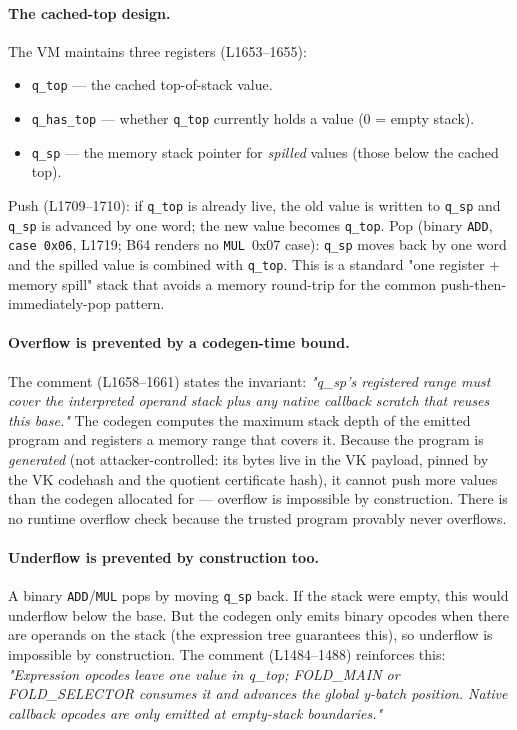 \paragraph{The cached-top design.} The VM maintains three
registers (L1653--1655):
\begin{itemize}
\item \texttt{q\_top} --- the cached top-of-stack value.
\item \texttt{q\_has\_top} --- whether \texttt{q\_top} currently
  holds a value (0 = empty stack).
\item \texttt{q\_sp} --- the memory stack pointer for
  \emph{spilled} values (those below the cached top).
\end{itemize}
Push (L1709--1710): if \texttt{q\_top} is already live, the old
value is written to \texttt{q\_sp} and \texttt{q\_sp} is advanced
by one word; the new value becomes \texttt{q\_top}. Pop
(binary \texttt{ADD}, \texttt{case 0x06}, L1719; B64 renders no
\texttt{MUL}~0x07 case): \texttt{q\_sp} moves
back by one word and the spilled value is combined with
\texttt{q\_top}. This is a standard "one register + memory spill"
stack that avoids a memory round-trip for the common
push-then-immediately-pop pattern.

\paragraph{Overflow is prevented by a codegen-time bound.} The
comment (L1658--1661) states the invariant: \emph{"q\_sp's
registered range must cover the interpreted operand stack plus any
native callback scratch that reuses this base."} The codegen
computes the maximum stack depth of the emitted program and
registers a memory range that covers it. Because the program is
\emph{generated} (not attacker-controlled: its bytes live in the VK
payload, pinned by the VK codehash and the quotient certificate
hash), it cannot push more
values than the codegen allocated for --- overflow is impossible
by construction. There is no runtime overflow check because the
trusted program provably never overflows.

\paragraph{Underflow is prevented by construction too.} A binary
\texttt{ADD}/\texttt{MUL} pops by moving \texttt{q\_sp} back. If
the stack were empty, this would underflow below the base. But the
codegen only emits binary opcodes when there are operands on the
stack (the expression tree guarantees this), so underflow is
impossible by construction. The comment (L1484--1488) reinforces
this: \emph{"Expression opcodes leave one value in q\_top;
FOLD\_MAIN or FOLD\_SELECTOR consumes it and advances the global
y-batch position. Native callback opcodes are only emitted at
empty-stack boundaries."}

